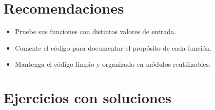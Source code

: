 \documentclass[12pt,a4paper]{article}
\begin{document}
\section*{Recomendaciones}
\begin{itemize}
    \item Pruebe sus funciones con distintos valores de entrada.
    \item Comente el código para documentar el propósito de cada función.
    \item Mantenga el código limpio y organizado en módulos reutilizables.
\end{itemize}

\section*{Ejercicios con soluciones}
\end{document}
